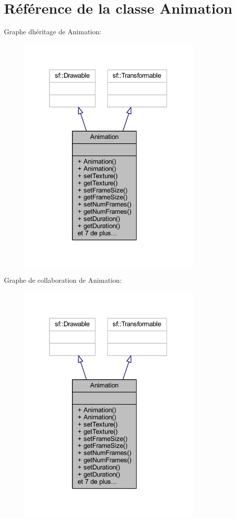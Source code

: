 \hypertarget{class_animation}{}\section{Référence de la classe Animation}
\label{class_animation}


Graphe d\textquotesingle{}héritage de Animation\+:\nopagebreak
\begin{figure}[H]
\begin{center}
\leavevmode
\includegraphics[width=260pt]{class_animation__inherit__graph}
\end{center}
\end{figure}


Graphe de collaboration de Animation\+:\nopagebreak
\begin{figure}[H]
\begin{center}
\leavevmode
\includegraphics[width=260pt]{class_animation__coll__graph}
\end{center}
\end{figure}
